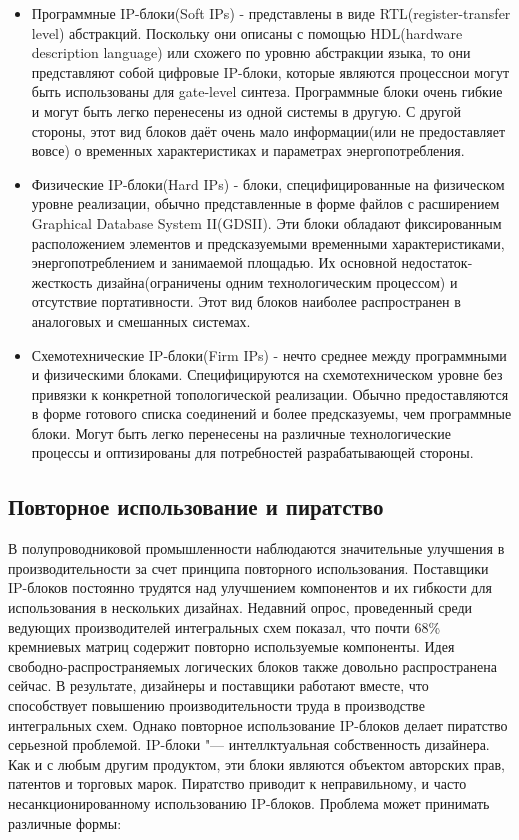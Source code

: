 \begin{itemize}
  \item Программные IP-блоки(Soft IPs) - представлены в виде RTL(register-transfer level) абстракций. Поскольку они описаны с помощью HDL(hardware description language) или схожего по уровню абстракции языка, то они представляют собой цифровые IP-блоки, которые являются процессно и могут быть использованы для gate-level синтеза. Программные блоки очень гибкие и могут быть легко перенесены из одной системы в другую. С другой стороны, этот вид блоков даёт очень мало информации(или не предоставляет вовсе) о временных характеристиках и параметрах энергопотребления.
  \item Физические IP-блоки(Hard IPs) - блоки, специфицированные на физическом уровне реализации, обычно представленные в форме файлов с расширением Graphical Database System II(GDSII). Эти блоки обладают фиксированным расположением элементов и предсказуемыми временными характеристиками, энергопотреблением и занимаемой площадью. Их основной недостаток- жесткость дизайна(ограничены одним технологическим процессом) и отсутствие портативности. Этот вид блоков наиболее распространен в аналоговых и смешанных системах.
  \item Схемотехнические IP-блоки(Firm IPs) - нечто среднее между программными и физическими блоками. Специфицируются на схемотехническом уровне без привязки к конкретной топологической реализации. Обычно предоставляются в форме готового списка соединений и более предсказуемы, чем программные блоки. Могут быть легко перенесены на различные технологические процессы и оптизированы для потребностей разрабатывающей стороны.
\end{itemize}


\subsection{Повторное использование и пиратство}
\label{page:domain:piracy}
В полупроводниковой промышленности наблюдаются значительные улучшения в производительности за счет принципа повторного использования. Поставщики IP-блоков постоянно трудятся над улучшением компонентов и их гибкости для использования в нескольких дизайнах. Недавний опрос, проведенный среди ведующих производителей интегральных схем показал, что почти 68\% кремниевых матриц содержит повторно используемые компоненты\cite{design_and_verification_report_2013}. Идея свободно-распространяемых логических блоков также довольно распространена сейчас. В результате, дизайнеры и поставщики работают вместе, что способствует повышению производительности труда в производстве интегральных схем. Однако повторное использование IP-блоков делает пиратство серьезной проблемой. IP-блоки "--- интеллктуальная собственность дизайнера. Как и с любым другим продуктом, эти блоки являются объектом авторских прав, патентов и торговых марок. Пиратство приводит к неправильному, и часто несанкционированному использованию IP-блоков. Проблема может принимать различные формы:

